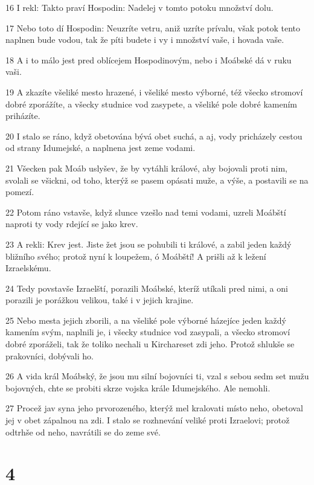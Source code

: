 \par 16 I rekl: Takto praví Hospodin: Nadelej v tomto potoku množství dolu.
\par 17 Nebo toto dí Hospodin: Neuzríte vetru, aniž uzríte prívalu, však potok tento naplnen bude vodou, tak že píti budete i vy i množství vaše, i hovada vaše.
\par 18 A i to málo jest pred oblícejem Hospodinovým, nebo i Moábské dá v ruku vaši.
\par 19 A zkazíte všeliké mesto hrazené, i všeliké mesto výborné, též všecko stromoví dobré zporážíte, a všecky studnice vod zasypete, a všeliké pole dobré kamením priházíte.
\par 20 I stalo se ráno, když obetována bývá obet suchá, a aj, vody pricházely cestou od strany Idumejské, a naplnena jest zeme vodami.
\par 21 Všecken pak Moáb uslyšev, že by vytáhli králové, aby bojovali proti nim, svolali se všickni, od toho, kterýž se pasem opásati muže, a výše, a postavili se na pomezí.
\par 22 Potom ráno vstavše, když slunce vzešlo nad temi vodami, uzreli Moábští naproti ty vody rdející se jako krev.
\par 23 A rekli: Krev jest. Jiste žet jsou se pohubili ti králové, a zabil jeden každý bližního svého; protož nyní k loupežem, ó Moábští! A prišli až k ležení Izraelskému.
\par 24 Tedy povstavše Izraelští, porazili Moábské, kteríž utíkali pred nimi, a oni porazili je porážkou velikou, také i v jejich krajine.
\par 25 Nebo mesta jejich zborili, a na všeliké pole výborné házejíce jeden každý kamením svým, naplnili je, i všecky studnice vod zasypali, a všecko stromoví dobré zporáželi, tak že toliko nechali u Kirchareset zdi jeho. Protož shlukše se prakovníci, dobývali ho.
\par 26 A vida král Moábský, že jsou mu silní bojovníci ti, vzal s sebou sedm set mužu bojovných, chte se probiti skrze vojska krále Idumejského. Ale nemohli.
\par 27 Procež jav syna jeho prvorozeného, kterýž mel kralovati místo neho, obetoval jej v obet zápalnou na zdi. I stalo se rozhnevání veliké proti Izraelovi; protož odtrhše od neho, navrátili se do zeme své.

\chapter{4}

